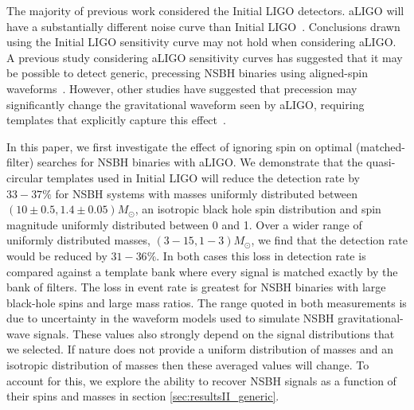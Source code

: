 The majority of previous work considered the Initial LIGO detectors. \ac{aLIGO}
will have a substantially different noise curve than Initial
LIGO~\cite{Aasi:2013wya}. Conclusions drawn using the Initial LIGO sensitivity
curve may not hold when considering \ac{aLIGO}. A previous study considering
\ac{aLIGO} sensitivity curves has suggested that it may be possible to detect
generic, precessing \ac{NSBH} binaries using aligned-spin 
waveforms~\cite{Ajith:2012mn}. However, other studies have suggested that
precession may significantly change the gravitational waveform seen by
\ac{aLIGO}, requiring templates that explicitly capture this
effect~\cite{Brown:2012gs}.

In this paper, we first investigate the effect of ignoring spin on optimal
(matched-filter) searches for \ac{NSBH} binaries with \ac{aLIGO}. We demonstrate
that the quasi-circular templates used in Initial LIGO will reduce the detection
rate by $33 - 37\%$ for \ac{NSBH} systems with masses uniformly distributed 
between
$(10\pm0.5,1.4\pm0.05)M_{\odot}$, an isotropic black hole spin distribution and 
spin magnitude uniformly distributed between 0 and 1. Over a wider range of 
uniformly distributed masses, $(3-15,1-3)M_{\odot}$, we find that the detection 
rate would be reduced
by $31 - 36\%$. In both cases this loss in detection rate is 
compared against a template bank where every signal is matched
exactly by the bank of filters. The loss in event rate is greatest for
\ac{NSBH} binaries with large black-hole spins and large mass ratios. The range
quoted in both measurements is due to uncertainty in the waveform models used to
simulate \ac{NSBH} gravitational-wave signals. These values also strongly 
depend on the signal distributions that we selected. If nature does not provide 
a uniform distribution of masses and an isotropic distribution of masses then 
these averaged values will change. To account for this, we explore the ability 
to recover \ac{NSBH} signals as a function of their spins and masses in section 
\ref{sec:resultsII_generic}.

